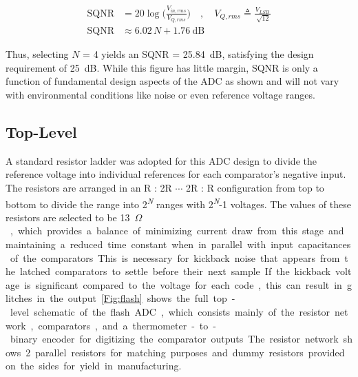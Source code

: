 \documentclass[11pt,letterpaper]{article}
\begin{document}
\begin{align}
    \mathrm{SQNR} &= 20\log\biggl(\frac{V_{in,rms}}{V_{Q,rms}}\biggr) \quad , \quad V_{Q,rms} \triangleq \frac{V_{LSB}}{\sqrt[]{12}}\\
    \mathrm{SQNR} &\approx 6.02\,N + \qty{1.76}{\dB}\label{eq:sqnr}
\end{align}

Thus, selecting \(N\) = 4 yields an SQNR = \qty{25.84}{\dB}, satisfying the design requirement of \qty{25}{\dB}. While this figure has little margin, SQNR is only a function of fundamental design aspects of the ADC as shown and will not vary with environmental conditions like noise or even reference voltage ranges.

\subsection{Top-Level}

A standard resistor ladder was adopted for this ADC design to divide the reference voltage into individual references for each comparator's negative input. The resistors are arranged in an R : 2R $\cdots$ 2R : R configuration from top to bottom to divide the range into 2\textsuperscript{\emph{N}} ranges with 2\textsuperscript{\emph{N}}-1 voltages. The values of these resistors are selected to be \qty{13}{\kilo$\Omega$}, which provides a balance of minimizing current draw from this stage and maintaining a reduced time constant when in parallel with input capacitances of the comparators. This is necessary for kickback noise that appears from the latched comparators to settle before their next sample. If the kickback voltage is significant compared to the voltage for each code, this can result in glitches in the output. \cref{Fig:flash} shows the full top-level schematic of the flash ADC, which consists mainly of the resistor network, comparators, and a thermometer-to-binary encoder for digitizing the comparator outputs. The resistor network shows 2 parallel resistors for matching purposes and dummy resistors provided on the sides for yield in manufacturing.
\end{document}
